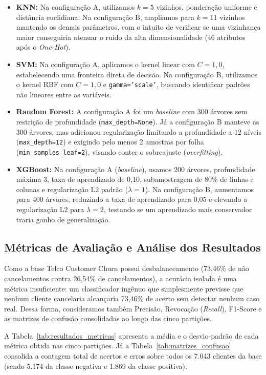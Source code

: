 \begin{itemize}
    \item \textbf{KNN:} Na configuração A, utilizamos $k=5$ vizinhos, ponderação uniforme e distância euclidiana. Na configuração B, ampliamos para $k=11$ vizinhos mantendo os demais parâmetros, com o intuito de verificar se uma vizinhança maior conseguiria atenuar o ruído da alta dimensionalidade (46 atributos após o \textit{One-Hot}).
    \item \textbf{SVM:} Na configuração A, aplicamos o kernel linear com $C=1{,}0$, estabelecendo uma fronteira direta de decisão. Na configuração B, utilizamos o kernel RBF com $C=1{,}0$ e \texttt{gamma='scale'}, buscando identificar padrões não lineares entre as variáveis.
    \item \textbf{Random Forest:} A configuração A foi um \textit{baseline} com 300 árvores sem restrição de profundidade (\texttt{max\_depth=None}). Já a configuração B manteve as 300 árvores, mas adicionou regularização limitando a profundidade a 12 níveis (\texttt{max\_depth=12}) e exigindo pelo menos 2 amostras por folha (\texttt{min\_samples\_leaf=2}), visando conter o sobreajuste (\textit{overfitting}).
    \item \textbf{XGBoost:} Na configuração A (\textit{baseline}), usamos 200 árvores, profundidade máxima 3, taxa de aprendizado de 0,10, subamostragem de 80\% de linhas e colunas e regularização L2 padrão ($\lambda=1$). Na configuração B, aumentamos para 400 árvores, reduzindo a taxa de aprendizado para 0,05 e elevando a regularização L2 para $\lambda=2$, testando se um aprendizado mais conservador traria ganho de generalização.
\end{itemize}

\subsection{Métricas de Avaliação e Análise dos Resultados}

Como a base Telco Customer Churn possui desbalanceamento (73,46\% de não cancelamentos contra 26,54\% de cancelamentos), a acurácia isolada é uma métrica insuficiente: um classificador ingênuo que simplesmente previsse que nenhum cliente cancelaria alcançaria 73,46\% de acerto sem detectar nenhum caso real. Dessa forma, consideramos também Precisão, Revocação (\textit{Recall}), F1-Score e as matrizes de confusão consolidadas ao longo das cinco partições.

A Tabela~\ref{tab:resultados_metricas} apresenta a média e o desvio-padrão de cada métrica obtida nas cinco partições. Já a Tabela~\ref{tab:matrizes_confusao} consolida a contagem total de acertos e erros sobre todos os 7.043 clientes da base (sendo 5.174 da classe negativa e 1.869 da classe positiva).

